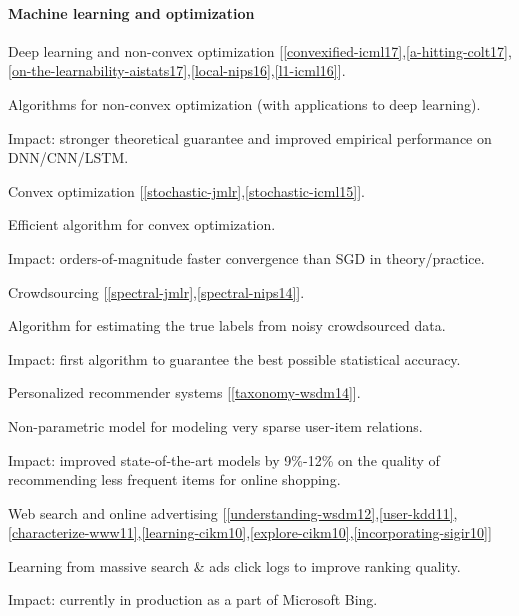 \documentclass{res}
\newenvironment{my_item}{
\begin{itemize}
  \setlength{\itemsep}{0pt}
  \setlength{\parskip}{0pt}
  \setlength{\parsep}{0pt}}
{\end{itemize}
}
\begin{document}
\begin{resume}
\paragraph{Machine learning and optimization}
\begin{my_item}
\item Deep learning and non-convex optimization [\ref{convexified-icml17},\ref{a-hitting-colt17},\ref{on-the-learnability-aistats17},\ref{local-nips16},\ref{l1-icml16}].
\begin{my_item}
\item Algorithms for non-convex optimization (with applications to deep learning).
\item Impact: stronger theoretical guarantee and improved empirical performance on DNN/CNN/LSTM.
\end{my_item}
\item Convex optimization [\ref{stochastic-jmlr},\ref{stochastic-icml15}].
\begin{my_item}
\item Efficient algorithm for convex optimization.
\item Impact: orders-of-magnitude faster convergence than SGD in theory/practice.
\end{my_item}
\item Crowdsourcing [\ref{spectral-jmlr},\ref{spectral-nips14}].
\begin{my_item}
\item Algorithm for estimating the true labels from noisy crowdsourced data.
\item Impact: first algorithm to guarantee the best possible statistical accuracy.
\end{my_item}
\item Personalized recommender systems [\ref{taxonomy-wsdm14}].
\begin{my_item}
\item Non-parametric model for modeling very sparse user-item relations.
\item Impact: improved state-of-the-art models by 9\%-12\% on the quality of recommending less frequent items for online shopping.
\end{my_item}
\item Web search and online advertising [\ref{understanding-wsdm12},\ref{user-kdd11},\ref{characterize-www11},\ref{learning-cikm10},\ref{explore-cikm10},\ref{incorporating-sigir10}]
\begin{my_item}
\item Learning from massive search \& ads click logs to improve ranking quality.
\item Impact: currently in production as a part of Microsoft Bing. 
\end{my_item}
\end{my_item}


\end{resume}
\end{document}
